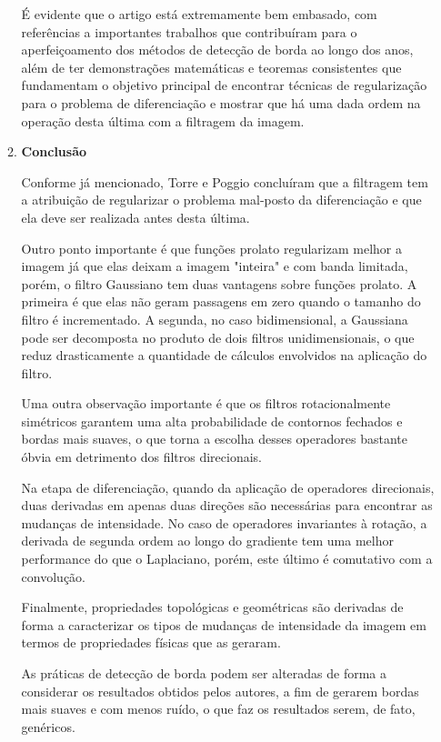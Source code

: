 \begin{enumerate}
\begin{enumerate}[label*=\arabic*.]
    É evidente que o artigo está extremamente bem embasado, com referências a importantes trabalhos que contribuíram para o aperfeiçoamento dos métodos de detecção de borda ao longo dos anos, além de ter demonstrações matemáticas e teoremas consistentes que fundamentam o objetivo principal de encontrar técnicas de regularização para o problema de diferenciação e mostrar que há uma dada ordem na operação desta última com a filtragem da imagem.
    \\[6pt]

    \item \textbf{Conclusão}
    
    Conforme já mencionado, Torre e Poggio concluíram que a filtragem tem a atribuição de regularizar o problema mal-posto da diferenciação e que ela deve ser realizada antes desta última.
    
    Outro ponto importante é que funções prolato regularizam melhor a imagem já que elas deixam a imagem "inteira" e com banda limitada, porém, o filtro Gaussiano tem duas vantagens sobre funções prolato. A primeira é que elas não geram passagens em zero quando o tamanho do filtro é incrementado. A segunda, no caso bidimensional, a Gaussiana pode ser decomposta no produto de dois filtros unidimensionais, o que reduz drasticamente a quantidade de cálculos envolvidos na aplicação do filtro.
    
    Uma outra observação importante é que os filtros rotacionalmente simétricos garantem uma alta probabilidade de contornos fechados e bordas mais suaves, o que torna a escolha desses operadores bastante óbvia em detrimento dos filtros direcionais.
    
    Na etapa de diferenciação, quando da aplicação de operadores direcionais, duas derivadas em apenas duas direções são necessárias para encontrar as mudanças de intensidade. No caso de operadores invariantes à rotação, a derivada de segunda ordem ao longo do gradiente tem uma melhor performance do que o Laplaciano, porém, este último é comutativo com a convolução.
    
    Finalmente, propriedades topológicas e geométricas são derivadas de forma a caracterizar os tipos de mudanças de intensidade da imagem em termos de propriedades físicas que as geraram.

    As práticas de detecção de borda podem ser alteradas de forma a considerar os resultados obtidos pelos autores, a fim de gerarem bordas mais suaves e com menos ruído, o que faz os resultados serem, de fato, genéricos.
    

\end{enumerate}
\end{enumerate}
